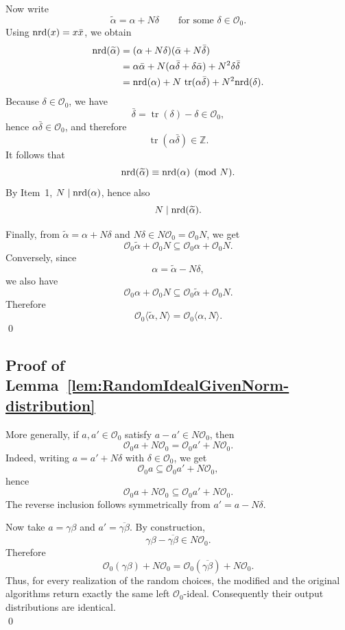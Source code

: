 Now write
\[
\widetilde{\alpha}=\alpha+N\delta
\qquad\text{for some }\delta\in\mathcal O_0.
\]
Using $\mathrm{nrd}(x)=x\bar x$, we obtain
\begin{align*}
\mathrm{nrd}(\widetilde{\alpha})
&=
(\alpha+N\delta)(\bar\alpha+N\bar\delta) \\
&=
\alpha\bar\alpha
+
N(\alpha\bar\delta+\delta\bar\alpha)
+
N^2\delta\bar\delta \\
&=
\mathrm{nrd}(\alpha)
+
N\,\operatorname{tr}(\alpha\bar\delta)
+
N^2\mathrm{nrd}(\delta).
\end{align*}
Because $\delta\in\mathcal O_0$, we have
\[
\bar\delta=\operatorname{tr}(\delta)-\delta\in\mathcal O_0,
\]
hence $\alpha\bar\delta\in\mathcal O_0$, and therefore
\[
\operatorname{tr}(\alpha\bar\delta)\in\mathbb Z.
\]
It follows that
\[
\mathrm{nrd}(\widetilde{\alpha})
\equiv
\mathrm{nrd}(\alpha)
\pmod N.
\]
By Item~1, $N\mid \mathrm{nrd}(\alpha)$, hence also
\[
N\mid \mathrm{nrd}(\widetilde{\alpha}).
\]

Finally, from $\widetilde{\alpha}=\alpha+N\delta$ and $N\delta\in N\mathcal O_0=\mathcal O_0N$, we get
\[
\mathcal O_0\widetilde{\alpha}+\mathcal O_0N
\subseteq
\mathcal O_0\alpha+\mathcal O_0N.
\]
Conversely, since
\[
\alpha=\widetilde{\alpha}-N\delta,
\]
we also have
\[
\mathcal O_0\alpha+\mathcal O_0N
\subseteq
\mathcal O_0\widetilde{\alpha}+\mathcal O_0N.
\]
Therefore
\[
\mathcal O_0\langle \widetilde{\alpha},N\rangle
=
\mathcal O_0\langle \alpha,N\rangle.
\] \qed

\subsection{Proof of Lemma~\ref{lem:RandomIdealGivenNorm-distribution}}
\label{subsec:RandomIdealGivenNorm-distribution}

More generally, if $a,a'\in \mathcal O_0$ satisfy $a-a'\in N\mathcal O_0$, then
\[
\mathcal O_0 a+N\mathcal O_0=\mathcal O_0 a'+N\mathcal O_0.
\]
Indeed, writing $a=a'+N\delta$ with $\delta\in\mathcal O_0$, we get
\[
\mathcal O_0 a \subseteq \mathcal O_0 a' + N\mathcal O_0,
\]
hence
\[
\mathcal O_0 a + N\mathcal O_0 \subseteq \mathcal O_0 a' + N\mathcal O_0.
\]
The reverse inclusion follows symmetrically from $a'=a-N\delta$.

Now take $a=\gamma\beta$ and $a'=\overline{\gamma\beta}$. By construction,
\[
\gamma\beta-\overline{\gamma\beta}\in N\mathcal O_0.
\]
Therefore
\[
\mathcal O_0(\gamma\beta)+N\mathcal O_0
=
\mathcal O_0(\overline{\gamma\beta})+N\mathcal O_0.
\]
Thus, for every realization of the random choices, the modified and the original
algorithms return exactly the same left $\mathcal O_0$-ideal. Consequently their
output distributions are identical.\\ \qed

